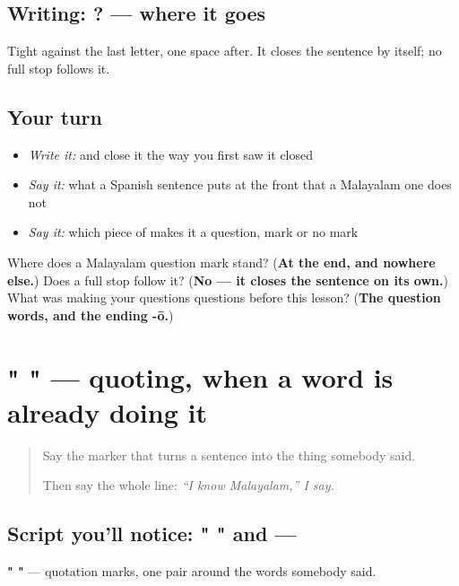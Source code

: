 \subsection*{Writing: ? — where it goes}
Tight against the last letter, one space after. It closes the sentence by itself; no full stop follows it.

\subsection*{Your turn}
\begin{itemize}
\raggedright
  \item \emph{Write it:} \textbf{  } and close it the way you first saw it closed
  \item \emph{Say it:} what a Spanish sentence puts at the front that a Malayalam one does not
  \item \emph{Say it:} which piece of \textbf{} makes it a question, mark or no mark
\end{itemize}

\begin{tcolorbox}[breakable,colback=teal!4,colframe=teal!35!black,title={Before you move on}]
Where does a Malayalam question mark stand? (\textbf{At the end, and nowhere else.}) Does a full stop follow it? (\textbf{No — it closes the sentence on its own.}) What was making your questions questions before this lesson? (\textbf{The question words, and the ending -ō.})
\end{tcolorbox}
\section[" " (quotation marks, dialogue dash)]{" " — quoting, when a word is already doing it}

\label{lesson:ML-W108-quotation}



\begin{quote}
Say the marker that turns a sentence into the thing somebody said.

Then say the whole line: \emph{\textquotedblleft{}I know Malayalam,\textquotedblright{} I say.}
\end{quote}

\subsection*{Script you'll notice: " " and —}
\textbf{" "} — quotation marks, one pair around the words somebody said.

